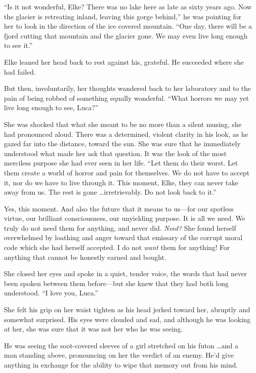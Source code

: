 ``Is it not wonderful, Elke? There was no lake here as late as sixty years ago. Now the glacier is retreating inland, leaving this gorge behind,'' he was pointing for her to look in the direction of the ice covered mountain. ``One day, there will be a fjord cutting that mountain and the glacier gone. We may even live long enough to see it.''

Elke leaned her head back to rest against his, grateful. He succeeded where she had failed.

But then, involuntarily, her thoughts wandered back to her laboratory and to the pain of being robbed of something equally wonderful. ``What horrors we may yet live long enough to see, Luca?''

She was shocked that what she meant to be no more than a silent musing, she had pronounced aloud. There was a determined, violent clarity in his look, as he gazed far into the distance, toward the sun. She was sure that he immediately understood what made her ask that question. It was the look of the most merciless purpose she had ever seen in her life. ``Let them do their worst. Let them create a world of horror and pain for themselves. We do not have to accept it, nor do we have to live through it. This moment, Elke, they can never take away from us. The rest is gone \ldots irretrievably. Do not look back to it.''

Yes, this moment. And also the future that it means to us---for our spotless virtue, our brilliant consciousness, our unyielding purpose. It is all we need. We truly do not need them for anything, and never did. \emph{Need?} She found herself overwhelmed by loathing and anger toward that emissary of the corrupt moral code which she had herself accepted. I do not \emph{want} them for anything! For anything that cannot be honestly earned and bought.

She closed her eyes and spoke in a quiet, tender voice, the words that had never been spoken between them before---but she knew that they had both long understood. ``I love you, Luca.''

She felt his grip on her waist tighten as his head jerked toward her, abruptly and somewhat surprised. His eyes were clouded and sad, and although he was looking at her, she was sure that it was not her who he was seeing.

He was seeing the soot-covered sleeves of a girl stretched on his futon \ldots and a man standing above, pronouncing on her the verdict of an enemy. He'd give anything in exchange for the ability to wipe that memory out from his mind.

